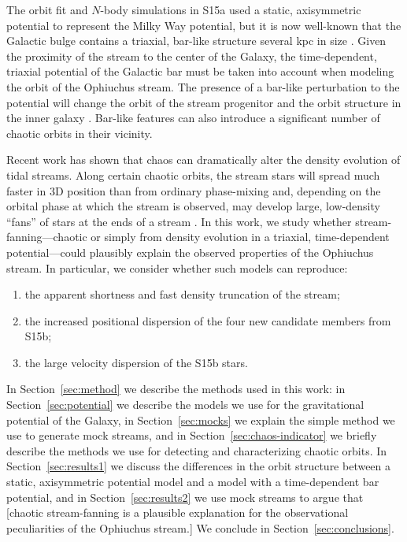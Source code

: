 \documentclass[letterpaper,12pt,preprint]{aastex}
\begin{document}
The orbit fit and $N$-body simulations in S15a used a static, axisymmetric potential to represent the Milky Way potential, but it is now well-known that the Galactic bulge contains a triaxial, bar-like structure several kpc in size \citep[e.g.,][]{blitzXX, wegg13, MANY}. Given the proximity of the stream to the center of the Galaxy, the time-dependent, triaxial potential of the Galactic bar must be taken into account when modeling the orbit of the Ophiuchus stream. The presence of a bar-like perturbation to the potential will change the orbit of the stream progenitor and the orbit structure in the inner galaxy \citep{athanassoula, portail15b, zotos12}. Bar-like features can also introduce a significant number of chaotic orbits in their vicinity\citep{weinberg15}.

Recent work has shown that chaos can dramatically alter the density evolution of tidal streams. Along certain chaotic orbits, the stream stars will spread much faster in 3D position than from ordinary phase-mixing and, depending on the orbital phase at which the stream is observed, may develop large, low-density ``fans'' of stars at the ends of a stream \citep{apw15-chaos}. In this work, we study whether stream-fanning---chaotic or simply from density evolution in a triaxial, time-dependent potential---could plausibly explain the observed properties of the Ophiuchus stream. In particular, we consider whether such models can reproduce:
\begin{enumerate}
	\item the apparent shortness and fast density truncation of the stream;
	\item the increased positional dispersion of the four new candidate members from S15b;
	\item the large velocity dispersion of the S15b stars.
\end{enumerate}

In Section~\ref{sec:method} we describe the methods used in this work: in Section~\ref{sec:potential} we describe the models we use for the gravitational potential of the Galaxy, in Section~\ref{sec:mocks} we explain the simple method we use to generate mock streams, and in Section~\ref{sec:chaos-indicator} we briefly describe the methods we use for detecting and characterizing chaotic orbits. In Section~\ref{sec:results1} we discuss the differences in the orbit structure between a static, axisymmetric potential model and a model with a time-dependent bar potential, and in Section~\ref{sec:results2} we use mock streams to argue that [chaotic stream-fanning is a plausible explanation for the observational peculiarities of the Ophiuchus stream.] We conclude in Section~\ref{sec:conclusions}.
\end{document}
